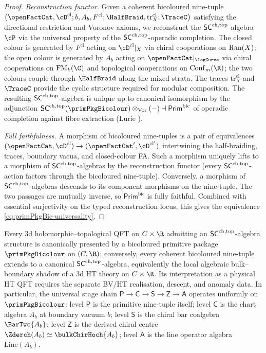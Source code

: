 \begin{proof}
\emph{Reconstruction functor.}
Given a coherent bicoloured nine-tuple $\bigl(\openFactCat,
\cD^{\mathrm{cl}}; b, A_b, F^{\mathrm{cl}}; \HalfBraid,
\mathrm{tr}^{\mathrm{cl}}_X; \TraceC\bigr)$ satisfying the
directional restriction and Voronov axioms, we reconstruct the
$\mathsf{SC}^{\mathrm{ch},\mathrm{top}}$-algebra $\cP$ via the universal property of the
$\mathsf{SC}^{\mathrm{ch},\mathrm{top}}$-operadic completion. The closed colour is generated by
$F^{\mathrm{cl}}$ acting on $\cD^{\mathrm{cl}}|_X$ via chiral
cooperations on $\mathrm{Ran}(X)$; the open colour is generated by $A_b$
acting on $\openFactCat|_{\logCurve}$ via chiral cooperations on
$\FM_k(\C)$ and topological cooperations on $\Conf_m(\R)$; the
two colours couple through $\HalfBraid$ along the mixed strata.
The traces $\mathrm{tr}^{\mathrm{cl}}_X$ and $\TraceC$ provide the
cyclic structure required for modular composition. The resulting
$\mathsf{SC}^{\mathrm{ch},\mathrm{top}}$-algebra is unique up to canonical isomorphism by the
adjunction
$\SCchtop(\primPkgBicolour) \otimes_{\mathrm{Vor}} (-) \dashv
\mathsf{Prim}^{\mathrm{bic}}$
of operadic completion against fibre extraction
\textup(Lurie \cite[Theorem 5.5.4.10]{HA}\textup).

\emph{Full faithfulness.}
A morphism of bicoloured nine-tuples is a pair of equivalences
$(\openFactCat, \cD^{\mathrm{cl}}) \to (\openFactCat',
\cD^{\mathrm{cl}'})$ intertwining the half-braiding, traces,
boundary vacua, and closed-colour FA. Such a morphism uniquely
lifts to a morphism of $\mathsf{SC}^{\mathrm{ch},\mathrm{top}}$-algebras by the reconstruction
functor \textup(every
$\mathsf{SC}^{\mathrm{ch},\mathrm{top}}$-action factors through the bicoloured nine-tuple\textup).
Conversely, a morphism of $\mathsf{SC}^{\mathrm{ch},\mathrm{top}}$-algebras descends to its
component morphisms on the nine-tuple. The two passages are mutually
inverse, so $\mathsf{Prim}^{\mathrm{bic}}$ is fully faithful.
Combined with essential surjectivity on the typed reconstruction locus, this gives the
equivalence \eqref{eq:primPkgBic-universality}.
\end{proof}

\begin{corollary}
\label{cor:bicoloured-primitive-universality-3dHT}
Every $3$d holomorphic--topological QFT on $C \times \R$ admitting
an $\mathsf{SC}^{\mathrm{ch},\mathrm{top}}$-algebra structure is canonically presented by a
bicoloured primitive package $\primPkgBicolour$ on $(C, \R)$;
conversely, every coherent bicoloured nine-tuple extends to a
canonical $\mathsf{SC}^{\mathrm{ch},\mathrm{top}}$-algebra, equivalently the local algebraic
bulk--boundary shadow of a $3$d HT theory on $C \times \R$. Its
interpretation as a physical HT QFT requires the separate BV/HT
realisation, descent, and anomaly data. In particular, the
universal stage chain
$\mathsf{P} \to \mathsf{C} \to \mathsf{S} \to \mathsf{Z} \to \mathsf{A}$
operates uniformly on $\primPkgBicolour$: level $\mathsf{P}$ is the
primitive nine-tuple itself; level $\mathsf{C}$ is the chart
algebra $A_b$ at boundary vacuum $b$; level $\mathsf{S}$ is the
chiral bar coalgebra $\BarTwc{A_b}$; level $\mathsf{Z}$ is the
derived chiral centre $\Zderch(A_b) \simeq \bulkChirHoch{A_b}$;
level $\mathsf{A}$ is the line operator algebra
$\mathrm{Line}(A_b)$.
\end{corollary}

